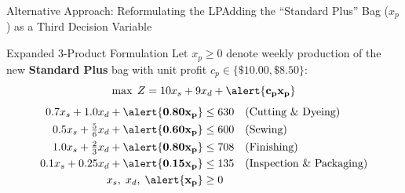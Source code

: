 \documentclass{beamer}
\begin{document}
\begin{frame}{Alternative Approach: Reformulating the LP}{Adding the ``Standard Plus'' Bag ($x_p$) as a Third Decision Variable}
\begin{block}{Expanded 3-Product Formulation}
\small
Let $x_p \ge 0$ denote weekly production of the new \textbf{Standard Plus} bag with unit profit $c_p \in \{\$10.00, \$8.50\}$:
\[
\max \; Z = 10x_s + 9x_d + \alert{\mathbf{c_p x_p}}
\]
\vspace{-0.8em}
\[
\begin{aligned}
0.7x_s + 1.0x_d + \alert{\mathbf{0.80x_p}} &\le 630 &&\text{(Cutting \& Dyeing)} \\
0.5x_s + \tfrac{5}{6}x_d + \alert{\mathbf{0.60x_p}} &\le 600 &&\text{(Sewing)} \\
1.0x_s + \tfrac{2}{3}x_d + \alert{\mathbf{0.80x_p}} &\le 708 &&\text{(Finishing)} \\
0.1x_s + 0.25x_d + \alert{\mathbf{0.15x_p}} &\le 135 &&\text{(Inspection \& Packaging)} \\
x_s,\; x_d,\; \alert{\mathbf{x_p}} &\ge 0
\end{aligned}
\]
\end{block}
\end{frame}
\end{document}
